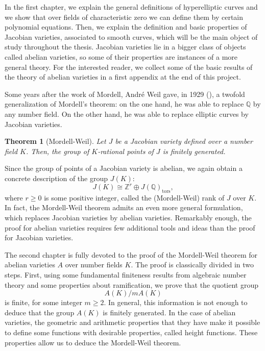 \documentclass[a4paper, 12pt]{amsart}
\theoremstyle{definition}
\theoremstyle{plain}
\theoremstyle{plain}
\newtheorem{thm0}[defn0]{Theorem}
\theoremstyle{plain}
\theoremstyle{plain}
\theoremstyle{remark}
\theoremstyle{remark}
\theoremstyle{plain}
\newenvironment{theorem}{ \begin{thm0}}{\end{thm0}}
\newcommand{\Q}{\mathbb{Q}}
\begin{document}
	In the first chapter, we explain the general definitions of hyperelliptic curves and we show that over fields of characteristic zero we can define them by certain polynomial equations. Then, we explain the definition and basic properties of Jacobian varieties, associated to smooth curves, which will be the main object of study throughout the thesis. Jacobian varieties lie in a bigger class of objects called abelian varieties, so some of their properties are instances of a more general theory. For the interested reader, we collect some of the basic results of the theory of abelian varieties in a first appendix at the end of this project.
	
	Some years after the work of Mordell, André Weil gave, in 1929 (\cite{10.1007/BF02592688}), a twofold generalization of Mordell's theorem: on the one hand, he was able to replace $\Q$ by any number field. On the other hand, he was able to replace elliptic curves by Jacobian varieties.
	
	\begin{theorem}[Mordell-Weil]
		Let $J$ be a Jacobian variety defined over a number field $K$. Then, the group of $K$-rational points of $J$ is finitely generated.
	\end{theorem}
	Since the group of points of a Jacobian variety is abelian, we again obtain a concrete description of the group $J(K)$:
	\begin{equation*}
		J(K)\cong \mathbb{Z}^r\oplus J(\Q)_{\text{tors}},
	\end{equation*}
	where $r\ge 0$ is some positive integer, called the (Mordell-Weil) rank of $J$ over $K$. In fact, the Mordell-Weil theorem admits an even more general formulation, which replaces Jacobian varieties by abelian varieties. Remarkably enough, the proof for abelian varieties requires few additional tools and ideas than the proof for Jacobian varieties.
	
	The second chapter is fully devoted to the proof of the Mordell-Weil theorem for abelian varieties $A$ over number fields $K$. The proof is classically divided in two steps. First, using some fundamental finiteness results from algebraic number theory and some properties about ramification, we prove that the quotient group 
	\begin{equation*}
		A(K)/mA(K)
	\end{equation*}
	 is finite, for some integer $m\ge 2$. In general, this information is not enough to deduce that the group $A(K)$ is finitely generated. In the case of abelian varieties, the geometric and arithmetic properties that they have make it possible to define some functions with desirable properties, called height functions. These properties allow us to deduce the Mordell-Weil theorem.
	
\end{document}
